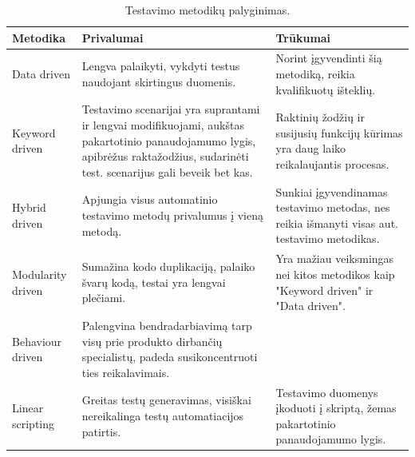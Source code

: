 \documentclass[a4paper,12pt,fleqn]{article}
\begin{document}
\begin{table}[!ht]
\centering
\begin{tabular}{l|p{55mm}|p{55mm}}
\textbf{Metodika} & \textbf{Privalumai} & \textbf{Trūkumai} \\
\hline
Data driven
  & Lengva palaikyti, vykdyti testus naudojant skirtingus duomenis.
  & Norint įgyvendinti šią metodiką, reikia kvalifikuotų išteklių. \\
\hline
Keyword driven
  & Testavimo scenarijai yra suprantami ir lengvai modifikuojami, aukštas pakartotinio panaudojamumo lygis, apibrėžus raktažodžius, sudarinėti test. scenarijus gali beveik bet kas.
  & Raktinių žodžių ir susijusių funkcijų kūrimas yra daug laiko reikalaujantis procesas. \\
\hline
Hybrid driven
  & Apjungia visus automatinio \newline testavimo metodų privalumus į vieną metodą.
  & Sunkiai įgyvendinamas testavimo metodas, nes reikia išmanyti visas aut. testavimo metodikas. \\
\hline
Modularity driven
  & Sumažina kodo duplikaciją, palaiko švarų kodą, testai yra lengvai plečiami.
  & Yra mažiau veiksmingas nei kitos metodikos kaip "Keyword driven" ir "Data driven". \\
\hline
Behaviour driven
  & Palengvina bendradarbiavimą tarp visų prie produkto dirbančių specialistų, padeda susikoncentruoti ties reikalavimais.
  & \\    
\hline
Linear scripting
  & Greitas testų generavimas, \newline visiškai nereikalinga testų automatiacijos patirtis.
  & Testavimo duomenys įkoduoti į skriptą, žemas pakartotinio panaudojamumo lygis. \\
\end{tabular}
\caption{Testavimo metodikų palyginimas.}
\label{table:comparison-between-approaches}
\end{table}



\end{document}
